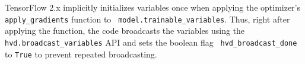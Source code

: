 TensorFlow 2.x implicitly initializes variables once when applying the
optimizer's {\tt apply\_gradients} function to {\tt
model.trainable\_variables}.
Thus, right after applying the function, the code broadcasts the variables
using the {\tt hvd.broadcast\_variables} API and sets the boolean flag {\tt
hvd\_broadcast\_done} to {\tt True} to prevent repeated broadcasting.
